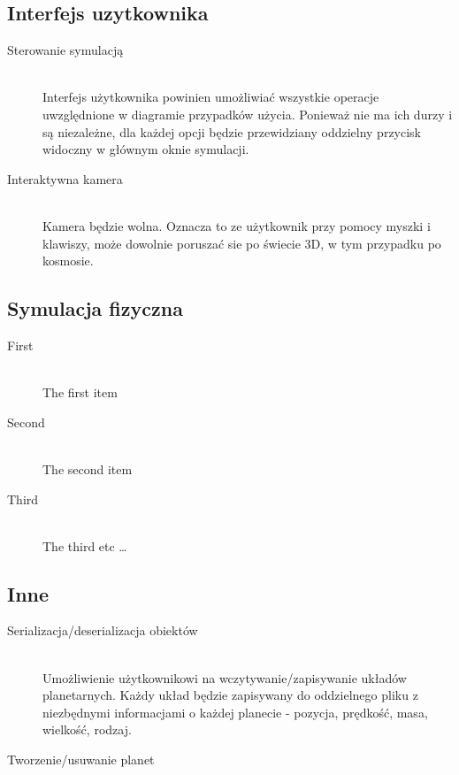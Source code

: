 \subsection{Interfejs uzytkownika}

\begin{description}
	\item[Sterowanie symulacją] \hfill \\
	Interfejs użytkownika powinien umożliwiać wszystkie operacje uwzględnione w diagramie przypadków użycia. Ponieważ nie ma ich durzy i są niezależne, dla każdej opcji będzie przewidziany oddzielny przycisk widoczny w głównym oknie symulacji.
	\item[Interaktywna kamera] \hfill \\
	Kamera będzie wolna. Oznacza to ze użytkownik przy pomocy myszki i klawiszy, może dowolnie poruszać sie po świecie 3D, w tym przypadku po kosmosie.
\end{description}

\subsection{Symulacja fizyczna}

\begin{description}
	\item[First] \hfill \\
	The first item
	\item[Second] \hfill \\
	The second item
	\item[Third] \hfill \\
	The third etc \ldots
\end{description}

\subsection{Inne}

\begin{description}
	\item[Serializacja/deserializacja obiektów] \hfill \\
	Umożliwienie użytkownikowi na wczytywanie/zapisywanie układów planetarnych. Każdy układ będzie zapisywany do oddzielnego pliku z niezbędnymi informacjami o każdej planecie - pozycja, prędkość, masa, wielkość, rodzaj.
	\item[Tworzenie/usuwanie planet] \hfill \\
\end{description}

